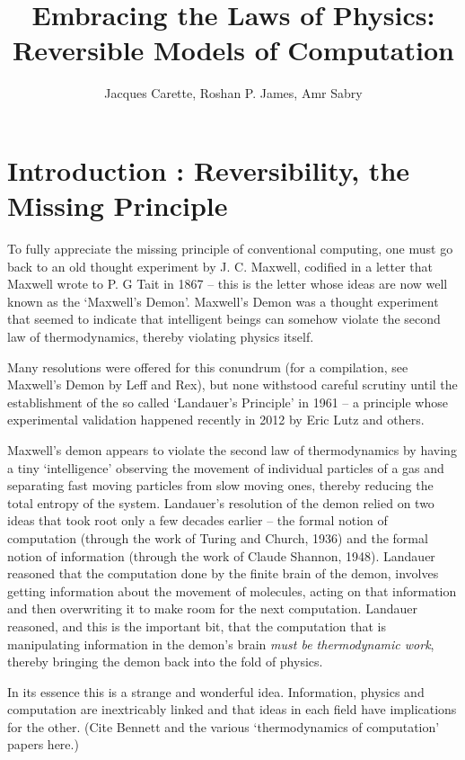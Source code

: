 \documentclass{article}
\title{Embracing the Laws of Physics: \\ Reversible Models of Computation}
\author{Jacques Carette, Roshan P. James, Amr Sabry}
\begin{document}
\maketitle

\section{Introduction : Reversibility, the Missing Principle}


To fully appreciate the missing principle of conventional computing,
one must go back to an old thought experiment by J. C. Maxwell,
codified in a letter that Maxwell wrote to P. G Tait in 1867 -- this
is the letter whose ideas are now well known as the `Maxwell's
Demon'. Maxwell's Demon was a thought experiment that seemed to
indicate that intelligent beings can somehow violate the second law of
thermodynamics, thereby violating physics itself.

Many resolutions were offered for this conundrum (for a compilation,
see Maxwell's Demon by Leff and Rex), but none withstood careful
scrutiny until the establishment of the so called `Landauer's
Principle' in 1961 -- a principle whose experimental validation
happened recently in 2012 by Eric Lutz and others.

Maxwell's demon appears to violate the second law of thermodynamics by
having a tiny `intelligence' observing the movement of individual
particles of a gas and separating fast moving particles from slow
moving ones, thereby reducing the total entropy of the
system. Landauer's resolution of the demon relied on two ideas that
took root only a few decades earlier -- the formal notion of
computation (through the work of Turing and Church, 1936) and the
formal notion of information (through the work of Claude Shannon,
1948). Landauer reasoned that the computation done by the finite brain
of the demon, involves getting information about the movement of
molecules, acting on that information and then overwriting it to make
room for the next computation.  Landauer reasoned, and this is the
important bit, that the computation that is manipulating information
in the demon's brain \textit{must be thermodynamic work}, thereby
bringing the demon back into the fold of physics.

In its essence this is a strange and wonderful idea. Information,
physics and computation are inextricably linked and that ideas in each
field have implications for the other. (Cite Bennett and the various
`thermodynamics of computation' papers here.)
\end{document}
